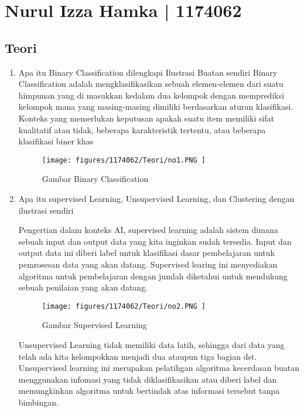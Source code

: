 \section{Nurul Izza Hamka | 1174062}
\subsection{Teori}
\begin{enumerate}

\item Apa itu Binary Classification dilengkapi Ilustrasi Buatan sendiri
Binary Classification adalah  mengklasifikasikan sebuah elemen-elemen dari suatu himpunan yang di masukkan kedalam dua kelompok dengan memprediksi  kelompok mana yang masing-masing dimiliki berdasarkan aturan klasifikasi. Konteks yang memerlukan keputusan apakah suatu item memiliki sifat kualitatif atau tidak, beberapa karakteristik tertentu, atau beberapa klasifikasi biner khas

\begin{figure}[H]
	\texttt{[image: figures/1174062/Teori/no1.PNG ]}
	\centering
	\caption{Gambar Binary Classification }
\end{figure}

\item Apa itu supervised Learning, Unsupervised Learning, dan Clustering dengan ilustrasi sendiri

Pengertian dalam konteks AI, supervised learning adalah sistem dimana sebuah input dan output data yang kita inginkan sudah tersedia. Input dan output data ini diberi label untuk klasifikasi dasar pembelajaran untuk pemrosesan data yang akan datang. Supervised learing ini menyediakan algoritma untuk pembelajaran dengan jumlah diketahui untuk mendukung sebuah penilaian yang akan datang.\\

\begin{figure}[H]
	\texttt{[image: figures/1174062/Teori/no2.PNG ]}
	\centering
	\caption{Gambar Supervised Learning }
\end{figure}

Unsupervised Learning tidak memiliki data latih, sehingga dari data yang telah ada kita kelompokkan menjadi dua ataupun tiga bagian dst. Unsupervised learning ini merupakan pelatihgan algoritma kecerdasan buatan menggunakan infomasi yang tidak diklasifikasikan atau diberi label dan memungkinkan algoritma untuk bertindak atas informasi tersebut tanpa bimbingan.\\


\end{enumerate}
